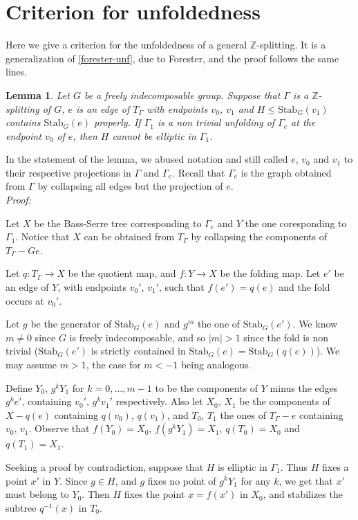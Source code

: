 \documentclass[12pt]{amsart}
\newtheorem{lemma}[theorem]{Lemma}
\newcommand{\Z}{\mathbb{Z}}
\newcommand{\Stab}{\mbox{Stab}}
\begin{document}
\section{Criterion for unfoldedness} \label{s-unf}

Here we give a criterion for the unfoldedness of a general $\Z$-splitting. It is a generalization of \ref{forester-unf}, due to Forester, and the proof follows the same lines.

\begin{lemma} \label{unf0} Let $G$ be a freely indecomposable group. Suppose that $\Gamma$ is a $\Z$-splitting of $G$, $e$ is an edge of $T_{\Gamma}$ with endpoints $v_0$, $v_1$ and $H \leq \Stab_G(v_1)$ contains $\Stab_G(e)$ properly. If $\Gamma_1$ is a non trivial unfolding of $\Gamma_e$ at the endpoint $v_0$ of $e$, then $H$ cannot be elliptic in $\Gamma_1$.
\end{lemma}

In the statement of the lemma, we abused notation and still called $e$, $v_0$ and $v_1$ to their respective projections in $\Gamma$ and $\Gamma_e$. Recall that $\Gamma_e$ is the graph obtained from $\Gamma$ by collapsing all edges but the projection of $e$.\\


{\em Proof:} 

Let $X$ be the Bass-Serre tree corresponding to $\Gamma_e$ and $Y$ the one coresponding to $\Gamma_1$. Notice that $X$ can be obtained from $T_{\Gamma}$ by collapsing the components of $T_{\Gamma} - Ge$.

Let $q:T_{\Gamma}\to X$ be the quotient map, and $f:Y \to X$ be the folding map. Let $e'$ be an edge of $Y$, with endpoints $v_0'$, $v_1'$, such that $f(e')=q(e)$ and the fold occurs at $v_0'$.

Let $g$ be the generator of $\Stab_G(e)$ and $g^m$ the one of $\Stab_G(e')$. We know $m\neq 0$ since $G$ is freely indecomposable, and so $|m|>1$ since the fold is non trivial ($\Stab_G(e')$ is strictly contained in $\Stab_G(e)=\Stab_G(q(e))$). We may assume $m>1$, the case for $m<-1$ being analogous.

Define $Y_0$, $g^kY_1$ for $k=0,\ldots,m-1$ to be the components of $Y$ minus the edges $g^ke'$, containing $v_0'$, $g^kv_1'$ respectively. Also let $X_0$, $X_1$ be the components of $X-q(e)$ containing $q(v_0)$, $q(v_1)$,  and $T_0$, $T_1$ the ones of $T_{\Gamma}-e$ containing $v_0$, $v_1$. Observe that $f(Y_0)=X_0$, $f(g^kY_1)=X_1$, $q(T_0)=X_0$ and $q(T_1)=X_1$.

Seeking a proof by contradiction, suppose that $H$ is elliptic in $\Gamma_1$. Thus $H$ fixes a point $x'$ in $Y$. Since $g\in H$, and $g$ fixes no point of $g^kY_1$ for any $k$, we get that $x'$ must belong to $Y_0$. Then $H$ fixes the point $x=f(x')$ in $X_0$, and stabilizes the subtree $q^{-1}(x)$ in $T_0$.
\end{document}
